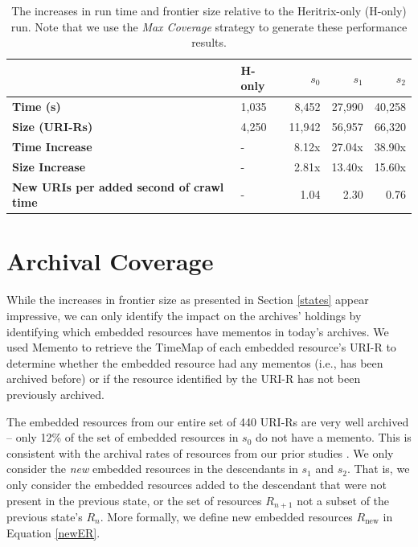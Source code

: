 \documentclass{sig-alternate}
\begin{document}
\begin{table}
\centering
\begin{tabular}{p{2.5cm} | p{0.75cm} | r | r | r}
 & \textbf{H-only} & \textbf{$s_0$} & \textbf{$s_1$} & \textbf{$s_2$}\\
\hline
\hline
\textbf{Time (s)} & 1,035 & 8,452 & 27,990 & 40,258\\
\hline
\textbf{Size (URI-Rs)} & 4,250 & 11,942 & 56,957 & 66,320\\
\hline
\hline
\textbf{Time Increase} & - & 8.12x & 27.04x & 38.90x\\
\hline
\textbf{Size Increase} & - & 2.81x & 13.40x & 15.60x\\
\hline
\textbf{New URIs per added second of crawl time} & - & 1.04 & 2.30 & 0.76\\
\hline
\end{tabular}
  \caption{The increases in run time and frontier size relative to the Heritrix-only (H-only) run. Note that we use the \emph{Max Coverage} strategy to generate these performance results.}
  \label{relatives}
\end{table}






\section{Archival Coverage}


While the increases in frontier size as presented in Section \ref{states} appear impressive, we can only identify the impact on the archives' holdings by identifying which embedded resources have mementos in today's archives. We used Memento to retrieve the TimeMap of each embedded resource's URI-R to determine whether the embedded resource had any mementos (i.e., has been archived before) or if the resource identified by the URI-R has not been previously archived.


The embedded resources from our entire set of 440 URI-Rs are very well archived -- only 12\% of the set of embedded resources in $s_0$ do not have a memento. This is consistent with the archival rates of resources from our prior studies \cite{hmotwia, ijdl}. 
We only consider the \emph{new} embedded resources in the descendants in $s_1$ and $s_2$. That is, we only consider the embedded resources added to the descendant that were not present in the previous state, or the set of resources $R_{n+1}$ not a subset of the previous state's $R_n$. More formally, we define new embedded resources $R_{\text{new}}$ in Equation \ref{newER}.
\end{document}
